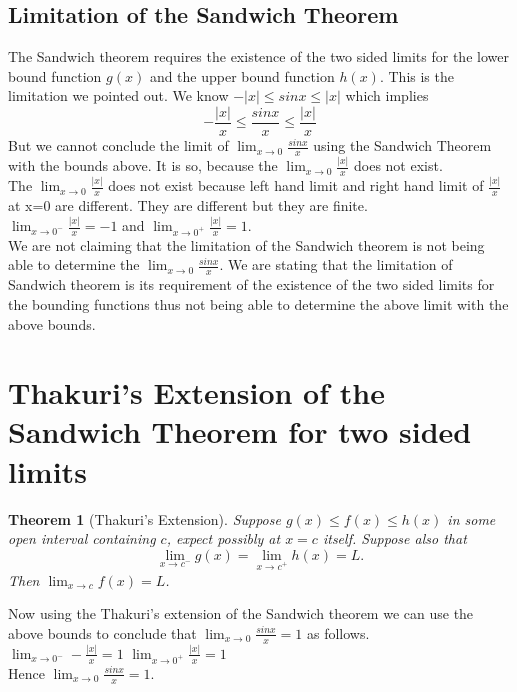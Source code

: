 \documentclass[a4paper,twoside,12pt]{article}
\theoremstyle{plain}
\newtheorem{theorem}{Theorem}[section]
\theoremstyle{definition}
\theoremstyle{theorem}
\begin{document}
{\subsection{Limitation of the Sandwich Theorem}
The Sandwich theorem requires the existence of the two sided limits for the lower bound function $g(x)$ and the upper bound function $h(x)$. This is the limitation we pointed out.
We know \(\displaystyle - \left | x \right | \leq sinx \leq \left | x \right | \) which implies \[-\frac{\left | x \right |}{x} \leq \frac{sinx}{x} \leq \frac{\left | x \right |}{x}\]
But we cannot conclude the limit of \(\displaystyle \lim_{x \to 0} \frac{sinx}{x}\) using the Sandwich Theorem with the bounds above. It is so, because the \(\displaystyle \lim_{x \to 0} \frac{|x|}{x}\) does not exist. \\[2mm]
The \(\displaystyle \lim_{x \to 0} \frac{|x|}{x}\) does not exist because left hand limit and right hand limit of \(\displaystyle \frac{|x|}{x}\) at x=0 are different. They are different but they are finite.\\
\(\displaystyle \lim_{x \to 0^-} \frac{|x|}{x}=-1\) \hspace{5mm} and \hspace{5cm} \(\displaystyle \lim_{x \to 0^+} \frac{|x|}{x}=1\). \\[3mm]
We are not claiming that the limitation of the Sandwich theorem is not being able to determine the \(\displaystyle \lim_{x \to 0} \frac{sinx}{x}\). We are stating that the limitation of Sandwich theorem is its requirement of  the existence of the two sided limits for the bounding functions thus not being able to determine the above limit with the above bounds.
\vspace{5mm}
\section{Thakuri's Extension of the Sandwich Theorem for two sided limits}
\begin{theorem}[Thakuri's Extension]
  \label{thakuri}
Suppose $g(x) \leq f(x) \leq h(x)$ in some open interval containing $c$, expect possibly at $x=c$ itself. Suppose also that $$\lim_{x \to c^-} g(x) = \lim_{x \to c^+} h(x) =L  .$$ Then $\displaystyle \lim_{x \to c} f(x)=L$.
\end{theorem}
Now using the Thakuri's extension of the Sandwich theorem we can use the above bounds to conclude that \(\displaystyle \lim_{x \to 0} \frac{sinx}{x}=1\) as follows. \\[2mm]
 \(\displaystyle \lim_{x \to 0^-} -\frac{|x|}{x}=1\) \hspace{7cm}
 \(\displaystyle \lim_{x \to 0^+} \frac{|x|}{x}=1\) \\[1mm]
 Hence \(\displaystyle \lim_{x \to 0} \frac{sinx}{x}=1\).

}
\end{document}
